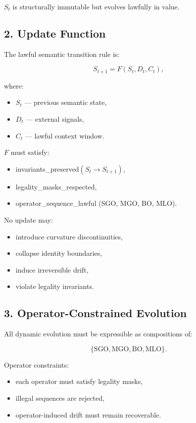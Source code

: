 $S_t$ is structurally immutable but evolves lawfully in value.

\subsection*{2. Update Function}
\label{boot:dsup_update_function}

The lawful semantic transition rule is:



\[
S_{t+1} = F(S_t, D_t, C_t),
\]



where:
\begin{itemize}[leftmargin=1.2cm]
    \item $S_t$ — previous semantic state,
    \item $D_t$ — external signals,
    \item $C_t$ — lawful context window.
\end{itemize}

$F$ must satisfy:
\begin{itemize}[leftmargin=1.2cm]
    \item invariants\_preserved$(S_t \rightarrow S_{t+1})$,
    \item legality\_masks\_respected,
    \item operator\_sequence\_lawful (SGO, MGO, BO, MLO).
\end{itemize}

No update may:
\begin{itemize}[leftmargin=1.2cm]
    \item introduce curvature discontinuities,
    \item collapse identity boundaries,
    \item induce irreversible drift,
    \item violate legality invariants.
\end{itemize}

\subsection*{3. Operator-Constrained Evolution}
\label{boot:dsup_operator_constraints}

All dynamic evolution must be expressible as compositions of:



\[
\{ \text{SGO}, \text{MGO}, \text{BO}, \text{MLO} \}.
\]



Operator constraints:
\begin{itemize}[leftmargin=1.2cm]
    \item each operator must satisfy legality masks,
    \item illegal sequences are rejected,
    \item operator-induced drift must remain recoverable.
\end{itemize}

